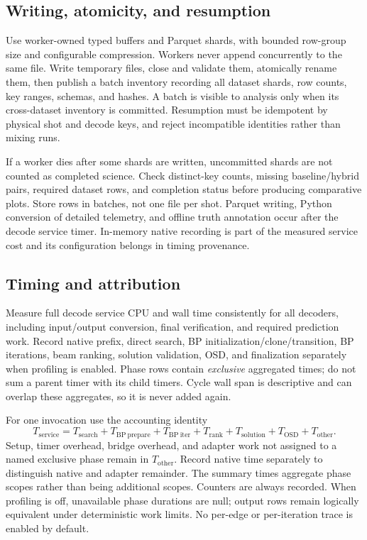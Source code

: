 \documentclass[11pt,a4paper]{article}
\begin{document}
\subsection{Writing, atomicity, and resumption}
Use worker-owned typed buffers and Parquet shards, with bounded row-group size and configurable compression. Workers never append concurrently to the same file. Write temporary files, close and validate them, atomically rename them, then publish a batch inventory recording all dataset shards, row counts, key ranges, schemas, and hashes. A batch is visible to analysis only when its cross-dataset inventory is committed. Resumption must be idempotent by physical shot and decode keys, and reject incompatible identities rather than mixing runs.

If a worker dies after some shards are written, uncommitted shards are not counted as completed science. Check distinct-key counts, missing baseline/hybrid pairs, required dataset rows, and completion status before producing comparative plots. Store rows in batches, not one file per shot. Parquet writing, Python conversion of detailed telemetry, and offline truth annotation occur after the decode service timer. In-memory native recording is part of the measured service cost and its configuration belongs in timing provenance.

\subsection{Timing and attribution}
Measure full decode service CPU and wall time consistently for all decoders, including input/output conversion, final verification, and required prediction work. Record native prefix, direct search, BP initialization/clone/transition, BP iterations, beam ranking, solution validation, OSD, and finalization separately when profiling is enabled. Phase rows contain \emph{exclusive} aggregated times; do not sum a parent timer with its child timers. Cycle wall span is descriptive and can overlap these aggregates, so it is never added again.

For one invocation use the accounting identity
\begin{equation}
 T_{\mathrm{service}}=
 T_{\mathrm{search}}+T_{\mathrm{BP\ prepare}}+T_{\mathrm{BP\ iter}}+
 T_{\mathrm{rank}}+T_{\mathrm{solution}}+T_{\mathrm{OSD}}+T_{\mathrm{other}}.
\end{equation}
Setup, timer overhead, bridge overhead, and adapter work not assigned to a named exclusive phase remain in $T_{\mathrm{other}}$. Record native time separately to distinguish native and adapter remainder. The summary times aggregate phase scopes rather than being additional scopes. Counters are always recorded. When profiling is off, unavailable phase durations are null; output rows remain logically equivalent under deterministic work limits. No per-edge or per-iteration trace is enabled by default.
\end{document}
